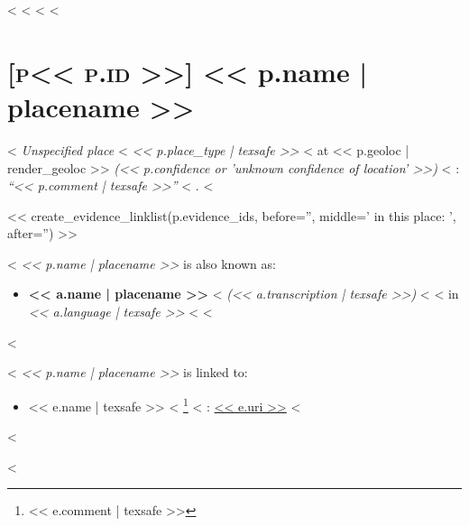 <%
<%
<%
<%
\section*{\hypertarget{place<<p.id>>}{\textsc{[p<< p.id >>]} << p.name | placename >>}}

<%
  \emph{Unspecified place}
<%
  \emph{<< p.place_type | texsafe >>}
<%
at
<< p.geoloc | render_geoloc >>
\emph{(<< p.confidence or 'unknown confidence of location' >>)}
<%
: \emph{\enquote{<< p.comment | texsafe >>}}
<%
.
<%


<< create_evidence_linklist(p.evidence_ids, before='', middle=' in this place: ', after='') >>

<%
  \emph{<< p.name | placename >>} is also known as:

  \begin{itemize}
    <%
    \item
      \textbf{<< a.name | placename >>}
      <%
      \emph{(<< a.transcription | texsafe >>)}
      <%
      <%
      in
      \emph{<< a.language | texsafe >>}
      <%
    <%
  \end{itemize}
<%

<%
  \emph{<< p.name | placename >>} is linked to:

  \begin{itemize}
    <%
    \item
      << e.name | texsafe >>
      <%
      \footnote{<< e.comment | texsafe >>}
      <%
      : \url{<< e.uri >>}
    <%
  \end{itemize}
<%

<%
